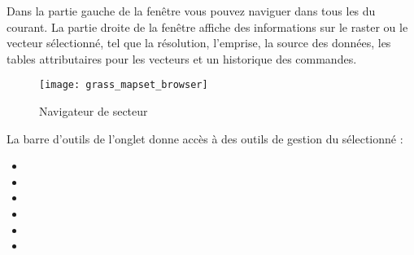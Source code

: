 {%
Dans la partie gauche de la fenêtre vous pouvez naviguer dans tous les  du  courant. La partie droite de la fenêtre affiche des informations sur le raster ou le vecteur sélectionné, tel que la résolution, l'emprise, la source des données, les tables attributaires pour les vecteurs et un historique des commandes.

\begin{figure}[ht]
 \begin{center}
 \texttt{[image: grass\_mapset\_browser]}
 \caption{Navigateur de secteur \grass \nixcaption}\label{fig:grass_mapset_browser}
 \end{center}
\end{figure}

La barre d'outils de l'onglet  donne accès à des outils de gestion du  sélectionné :

\begin{itemize}[label=--]
\item {}
\item {}
\item {}
\item {}
\item {}
\item {}
\end{itemize}

}
